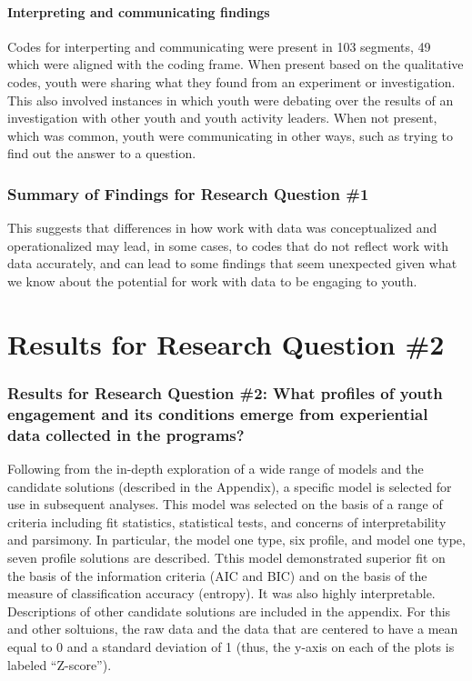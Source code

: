 \documentclass[]{msu-thesis}
\theoremstyle{definition}
\theoremstyle{definition}
\theoremstyle{definition}
\theoremstyle{remark}
\begin{document}
\subsubsection{Interpreting and communicating
findings}\label{interpreting-and-communicating-findings}

Codes for interperting and communicating were present in 103 segments,
49 which were aligned with the coding frame. When present based on the
qualitative codes, youth were sharing what they found from an experiment
or investigation. This also involved instances in which youth were
debating over the results of an investigation with other youth and youth
activity leaders. When not present, which was common, youth were
communicating in other ways, such as trying to find out the answer to a
question.

\subsection{Summary of Findings for Research Question
\#1}\label{summary-of-findings-for-research-question-1}

This suggests that differences in how work with data was conceptualized
and operationalized may lead, in some cases, to codes that do not
reflect work with data accurately, and can lead to some findings that
seem unexpected given what we know about the potential for work with
data to be engaging to youth.

\chapter{Results for Research Question
\#2}\label{results-for-research-question-2}

\subsection{Results for Research Question \#2: What profiles of youth
engagement and its conditions emerge from experiential data collected in
the
programs?}\label{results-for-research-question-2-what-profiles-of-youth-engagement-and-its-conditions-emerge-from-experiential-data-collected-in-the-programs}

Following from the in-depth exploration of a wide range of models and
the candidate solutions (described in the Appendix), a specific model is
selected for use in subsequent analyses. This model was selected on the
basis of a range of criteria including fit statistics, statistical
tests, and concerns of interpretability and parsimony. In particular,
the model one type, six profile, and model one type, seven profile
solutions are described. Tthis model demonstrated superior fit on the
basis of the information criteria (AIC and BIC) and on the basis of the
measure of classification accuracy (entropy). It was also highly
interpretable. Descriptions of other candidate solutions are included in
the appendix. For this and other soltuions, the raw data and the data
that are centered to have a mean equal to 0 and a standard deviation of
1 (thus, the y-axis on each of the plots is labeled ``Z-score'').
\end{document}
